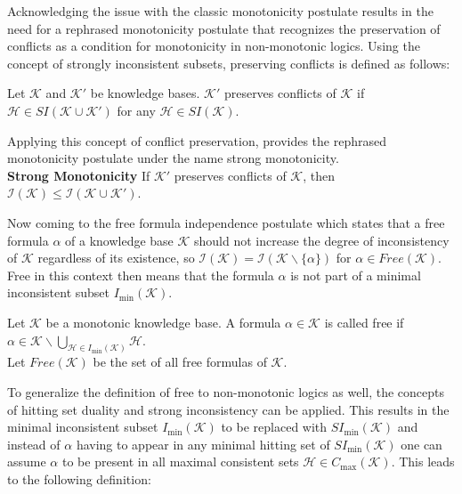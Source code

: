 Acknowledging the issue with the classic monotonicity postulate results in the need for a rephrased monotonicity postulate that recognizes the preservation of conflicts as a condition for monotonicity in non-monotonic logics. Using the concept of strongly inconsistent subsets, preserving conflicts is defined as follows:

\begin{definition}\label{def:monotonic}
    Let \(\mathcal{K}\) and \(\mathcal{K}'\) be knowledge bases. \(\mathcal{K}'\) preserves conflicts of \(\mathcal{K}\) if \(\mathcal{H} \in SI(\mathcal{K} \cup \mathcal{K}')\) for any \(\mathcal{H} \in SI(\mathcal{K})\).
\end{definition}

Applying this concept of conflict preservation, \cite{ulbricht_handling_2020} provides the rephrased monotonicity postulate under the name strong monotonicity.
\\
\textbf{Strong Monotonicity}
If \(\mathcal{K}'\) preserves conflicts of \(\mathcal{K}\), then \(\mathcal{I}(\mathcal{K}) \leq \mathcal{I}(\mathcal{K \cup \mathcal{K}'})\).

Now coming to the free formula independence postulate which states that a free formula \(\alpha\) of a knowledge base \(\mathcal{K}\) should not increase the degree of inconsistency of \(\mathcal{K}\) regardless of its existence, so \(\mathcal{I}(\mathcal{K}) = \mathcal{I}(\mathcal{K} \backslash \{\alpha\})\) for \(\alpha \in Free(\mathcal{K})\). Free in this context then means that the formula \(\alpha\) is not part of a minimal inconsistent subset \(I_{\min}(\mathcal{K})\).

\begin{definition}
    Let \(\mathcal{K}\) be a monotonic knowledge base. A formula \(\alpha \in \mathcal{K}\) is called free if\\
    \(\alpha \in \mathcal{K} \backslash \bigcup\limits_{\mathcal{H} \in I_{\min}(\mathcal{K})} \mathcal{H}\).\\
    Let \(Free(\mathcal{K})\) be the set of all free formulas of \(\mathcal{K}\).
\end{definition}

To generalize the definition of free to non-monotonic logics as well, the concepts of hitting set duality and strong inconsistency can be applied. This results in the minimal inconsistent subset \(I_{\min}(\mathcal{K})\) to be replaced with \(SI_{\min}(\mathcal{K})\) and instead of \(\alpha\) having to appear in any minimal hitting set of \(SI_{\min}(\mathcal{K})\) one can assume \(\alpha\) to be present in all maximal consistent sets \(\mathcal{H} \in C_{\max}(\mathcal{K})\). This leads to the following definition:

